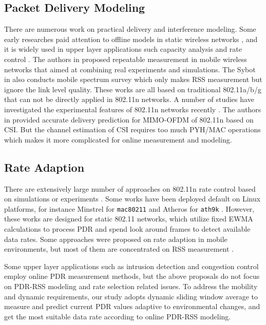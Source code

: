 \documentclass[draftclsnofoot,journal,onecolumn,11pt]{IEEEtran}
\begin{document}
\subsection{Packet Delivery Modeling}
There are numerous work on practical delivery and interference modeling. Some early researches paid attention to offline models in static wireless networks \cite{kolar2011mesh} \cite{reis2006model}, and it is widely used in upper layer applications such capacity analysis \cite{kashyap2007capacity} and rate control \cite{chen2011ram} \cite{judd2008efficient}. The authors in \cite{10.1109/TMC.2009.87} proposed repeatable measurement in mobile wireless networks that aimed at combining real experiments and simulations. The Sybot in \cite{kim2010sybot} also conducts mobile spectrum survey which only makes RSS measurement but ignore the link level quality. These works are all based on traditional 802.11a/b/g that can not be directly applied in 802.11n networks. A number of studies have investigated the experimental features of 802.11n networks recently \cite{Halperin2010predictable} \cite{k.rayanchu:fluid:}. The authors in \cite{Halperin2010predictable} provided accurate delivery prediction for MIMO-OFDM of 802.11n based on CSI. But the channel estimation of CSI \cite{CSI-SF} requires too much PYH/MAC operations which makes it more complicated for online measurement and modeling.

\subsection{Rate Adaption}
There are extensively large number of approaches on 802.11n rate control based on simulations or experiments \cite{kim2009experimental} \cite{Pefkianakis:2010} \cite{zhang2008practical}. Some works have been deployed default on Linux platforms, for instance Minstrel \cite{minstrel} for \texttt{mac80211} and Atheros for \texttt{ath9k} \cite{wong2008wireless}. However, these works are designed for static 802.11 networks, which utilize fixed EWMA calculations to process PDR and spend look around frames to detect available data rates. Some approaches were proposed on rate adaption in mobile environments, but most of them are concentrated on RSS measurement \cite{chen2011ram} \cite{judd2008efficient}.

Some upper layer applications such as intrusion detection \cite{5620919} and congestion control \cite{floyd2000equation} employ online PDR measurement methods, but the above proposals do not focus on PDR-RSS modeling and rate selection related issues. To address the mobility and dynamic requirements, our study adopts dynamic sliding window average to measure and predict current PDR values adaptive to environmental changes, and get the most suitable data rate according to online PDR-RSS modeling.
\end{document}
